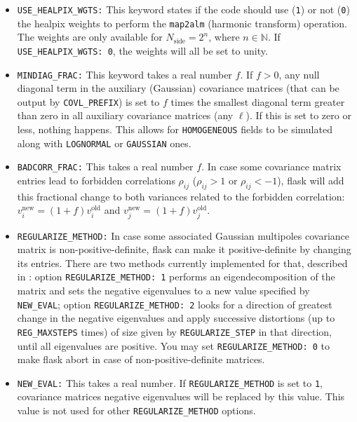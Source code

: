 \documentclass[12pt]{book} %
\newcommand{\nv}[1]{\mathrm{#1}}                 %
\begin{document}
\begin{itemize}
\item {\tt USE\_HEALPIX\_WGTS:} This keyword states if the code should use ({\tt 1}) or not ({\tt 0}) 
  the {\sc healpix} weights to perform the {\tt map2alm} (harmonic transform) operation. The 
  weights are only available for $N_{\nv{side}}=2^n$, where $n\in \mathbb{N}$. If 
  {\tt USE\_HEALPIX\_WGTS: 0}, the weights will all be set to unity.

\item {\tt MINDIAG\_FRAC:} This keyword takes a real number $f$. If $f>0$, any null diagonal term in 
  the auxiliary (Gaussian) covariance matrices (that can be output by {\tt COVL\_PREFIX}) is set to $f$ times the 
  smallest diagonal term greater than zero in all auxiliary covariance matrices (any $\ell$). If this 
  is set to zero or less, nothing happens. This allows for {\tt HOMOGENEOUS} fields to be simulated 
  along with {\tt LOGNORMAL} or {\tt GAUSSIAN} ones.

\item {\tt BADCORR\_FRAC:} This takes a real number $f$. In case some covariance matrix entries 
  lead to forbidden correlations $\rho_{ij}$ ($\rho_{ij}>1$ or $\rho_{ij}<-1$), {\sc flask} will 
  add this fractional change to both variances related to the forbidden correlation: 
  $v_i^{\nv{new}} = (1+f)v_i^{\nv{old}}$ and $v_j^{\nv{new}} = (1+f)v_j^{\nv{old}}$.

\item {\tt REGULARIZE\_METHOD:} In case some associated Gaussian multipoles covariance matrix 
  is non-positive-definite, {\sc flask} can make it positive-definite by changing its entries. 
  There are two methods currently implemented for that, described in \citet{Xavier16mn}: option 
  {\tt REGULARIZE\_METHOD: 1} performs an eigendecomposition of the matrix and sets the negative eigenvalues to a 
  new value specified by {\tt NEW\_EVAL}; option {\tt REGULARIZE\_METHOD: 2} looks for a direction of greatest 
  change in the negative eigenvalues and apply successive distortions (up to {\tt REG\_MAXSTEPS} 
  times) of size given by {\tt REGULARIZE\_STEP} in that direction, until all eigenvalues are positive. You may set 
  {\tt REGULARIZE\_METHOD: 0} to make {\sc flask} abort in case of non-positive-definite matrices. 

\item {\tt NEW\_EVAL:} This takes a real number. If {\tt REGULARIZE\_METHOD} is set to {\tt 1}, 
  covariance matrices negative eigenvalues will be replaced by this value. This value is not used 
  for other {\tt REGULARIZE\_METHOD} options.


\end{itemize}
\end{document}
